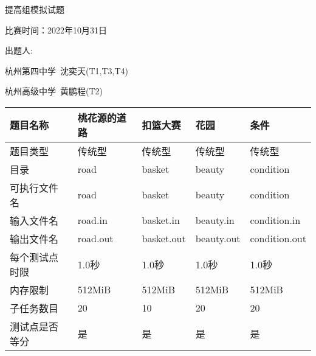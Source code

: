 \documentclass[final,11pt,oneside,UTF8]{report}
\begin{document}
\centerline{\LARGE{提高组模拟试题}}
\centerline{}
\centerline{\LARGE{比赛时间：2022年10月31日}}
\centerline{}
\centerline{出题人:}
\centerline{杭州第四中学\ 沈奕天(T1,T3,T4)}
\centerline{杭州高级中学\ 黄鹏程(T2)}
\centerline{}
\begin{table}[h]
    \centering
    \begin{tabular}{lllll}
        \hline
        \multicolumn{1}{|l|}{题目名称}    & \multicolumn{1}{l|}{桃花源的道路}   & \multicolumn{1}{l|}{扣篮大赛}          & \multicolumn{1}{l|}{花园}         & \multicolumn{1}{l|}{条件}            \\ \hline
        \multicolumn{1}{|l|}{题目类型}    & \multicolumn{1}{l|}{传统型}      & \multicolumn{1}{l|}{传统型}           & \multicolumn{1}{l|}{传统型}        & \multicolumn{1}{l|}{传统型}           \\ \hline
        \multicolumn{1}{|l|}{目录}      & \multicolumn{1}{l|}{road}     & \multicolumn{1}{l|}{basket}        & \multicolumn{1}{l|}{beauty}     & \multicolumn{1}{l|}{condition}     \\ \hline
        \multicolumn{1}{|l|}{可执行文件名}  & \multicolumn{1}{l|}{road}     & \multicolumn{1}{l|}{basket}        & \multicolumn{1}{l|}{beauty}     & \multicolumn{1}{l|}{condition}     \\ \hline
        \multicolumn{1}{|l|}{输入文件名}   & \multicolumn{1}{l|}{road.in}  & \multicolumn{1}{l|}{basket.in}     & \multicolumn{1}{l|}{beauty.in}  & \multicolumn{1}{l|}{condition.in}  \\ \hline
        \multicolumn{1}{|l|}{输出文件名}   & \multicolumn{1}{l|}{road.out} & \multicolumn{1}{l|}{basket.out}    & \multicolumn{1}{l|}{beauty.out} & \multicolumn{1}{l|}{condition.out} \\ \hline
        \multicolumn{1}{|l|}{每个测试点时限} & \multicolumn{1}{l|}{1.0秒}     & \multicolumn{1}{l|}{1.0秒}          & \multicolumn{1}{l|}{1.0秒}       & \multicolumn{1}{l|}{1.0秒}          \\ \hline
        \multicolumn{1}{|l|}{内存限制}    & \multicolumn{1}{l|}{512MiB}   & \multicolumn{1}{l|}{512MiB}        & \multicolumn{1}{l|}{512MiB}     & \multicolumn{1}{l|}{512MiB}        \\ \hline
        \multicolumn{1}{|l|}{子任务数目}   & \multicolumn{1}{l|}{20}       & \multicolumn{1}{l|}{10}            & \multicolumn{1}{l|}{20}         & \multicolumn{1}{l|}{20}            \\ \hline
        \multicolumn{1}{|l|}{测试点是否等分} & \multicolumn{1}{l|}{是}        & \multicolumn{1}{l|}{是}             & \multicolumn{1}{l|}{是}          & \multicolumn{1}{l|}{是}             \\ \hline

\end{tabular}
\end{table}
\end{document}
